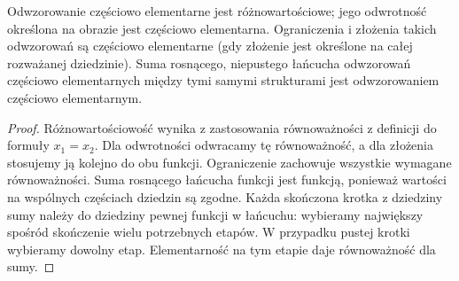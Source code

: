 \begin{lemat}
\label{lem:mod-partial-elementary}
Odwzorowanie częściowo elementarne jest różnowartościowe;
jego odwrotność określona na obrazie jest częściowo
elementarna. Ograniczenia i złożenia takich odwzorowań
są częściowo elementarne (gdy złożenie jest określone
na całej rozważanej dziedzinie).
Suma rosnącego, niepustego łańcucha odwzorowań częściowo
elementarnych między tymi samymi strukturami jest
odwzorowaniem częściowo elementarnym.
\end{lemat}
\begin{proof}
Różnowartościowość wynika z zastosowania równoważności
z definicji do formuły $x_1=x_2$. Dla odwrotności odwracamy
tę równoważność, a dla złożenia stosujemy ją kolejno
do obu funkcji. Ograniczenie zachowuje wszystkie wymagane
równoważności. Suma rosnącego łańcucha funkcji jest funkcją,
ponieważ wartości na wspólnych częściach dziedzin są zgodne.
Każda skończona krotka z dziedziny sumy należy do dziedziny
pewnej funkcji w łańcuchu: wybieramy największy spośród
skończenie wielu potrzebnych etapów. W przypadku pustej
krotki wybieramy dowolny etap. Elementarność na tym etapie
daje równoważność dla sumy.
\end{proof}

